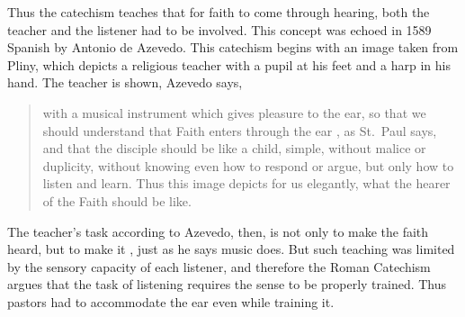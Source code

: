 Thus the catechism teaches that for faith to come through hearing, both the 
teacher and the listener had to be involved.
This concept was echoed in 1589 Spanish  by Antonio de Azevedo.%
  \Autocite{Azevedo:Catecismo}
This catechism begins with an image taken from Pliny, which depicts a religious 
teacher with a pupil at his feet and a harp in his hand.
The teacher is shown, Azevedo says,
\begin{quote}
    with a musical instrument which gives pleasure to the ear, so that we 
    should understand that Faith enters through the ear , as 
    St.\ Paul says, and that the disciple should be like a child, simple, without 
    malice or duplicity, without knowing even how to respond or argue, but only how 
    to listen and learn.
    Thus this image depicts for us elegantly, what the hearer of the Faith 
    should be like.%
        \Autocite
        [f.~1b: 
        ]
        {Azevedo:Catecismo}
\end{quote}

The teacher's task according to Azevedo, then, is not only to make the faith 
heard, but to make it , just as he says music does.
But such teaching was limited by the sensory capacity of each listener, and 
therefore the Roman Catechism argues that the task of listening requires the 
sense to be properly trained.
Thus pastors had to accommodate the ear even while training it.

